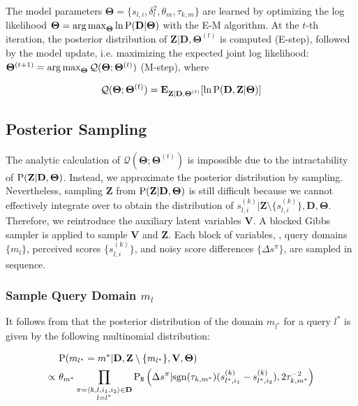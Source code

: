 The model parameters $\mathbf{\Theta} = \{ s_{l,i}, \delta_l^2, \theta_m,
\tau_{k,m}\}$ are learned by optimizing the log likelihood $\mathbf{\Theta} =
\argmax_{\mathbf{\Theta}} \ln \P(\mathbf{D | \Theta})$ with the E-M algorithm.
At the $t$-th iteration, the posterior distribution of $\mathbf{Z |
D,\Theta}^{(t)}$ is computed (E-step), followed by the model update, i.e.
maximizing the expected joint log likelihood: $\mathbf{\Theta}^{(t+1)} =
\argmax_\mathbf{\Theta} \mathcal{Q}(\mathbf{\Theta}; \mathbf{\Theta}^{(t)})$
(M-step), where

\begin{equation}
\mathcal{Q}(\mathbf{\Theta}; \mathbf{\Theta}^{(t)}) =
  \E_{\mathbf{Z | D,\Theta}^{(t)}}[\ln \P(\mathbf{D,Z | \Theta})]
\end{equation}

\subsection{Posterior Sampling}

The analytic calculation of $\mathcal{Q}(\mathbf{\Theta};
\mathbf{\Theta}^{(t)})$ is impossible due to the intractability of $\P(\mathbf{Z
| D, \Theta})$. Instead, we approximate the posterior distribution by sampling.
Nevertheless, sampling $\mathbf{Z}$ from $\P(\mathbf{Z | D, \Theta})$ is still
difficult because we cannot effectively integrate over  to
obtain the distribution of $s_{l,i}^{(k)} | \mathbf{Z} \setminus
\{s_{l,i}^{(k)}\},\mathbf{D,\Theta}$.  Therefore, we reintroduce the auxiliary
latent variables $\mathbf{V}$. A blocked Gibbs sampler
\cite{geman1984stochastic} is applied to sample $\mathbf{V}$ and $\mathbf{Z}$.
Each block of variables, \ie, query domains $\{m_l\}$, perceived scores
$\{s_{l,i}^{(k)}\}$, and noisy score differences $\{\Delta s^\pi\}$, are sampled
in sequence.

\subsubsection{Sample Query Domain $m_l$} It follows from
 that the posterior distribution of the domain
$m_{l^*}$ for a query $l^*$ is given by the following multinomial distribution:

\begin{align}
& \P(m_{l^*} = m^* |
  \mathbf{D}, \mathbf{Z}\setminus \{ m_{l^*}\}, \mathbf{V}, \mathbf{\Theta})
  \label{eq::tpp_m} \\
\propto~ &  \theta_{m^*}
  \prod\limits_{\substack{\pi = \langle k,l,i_1,i_2\rangle \in \mathbf{D}
    \\ l = l^*}}
  \P_{\mathtt{N}}\left(\Delta s^\pi |
    \mathrm{sgn}(\tau_{k,m^*}) ( s_{l^*,i_1}^{(k)} -  s_{l^*,i_2}^{(k)}),
                2\tau_{k,m^*}^{-2}\right) \nonumber
\end{align}


